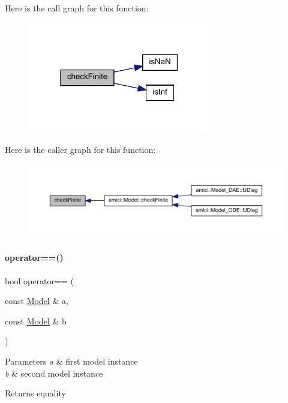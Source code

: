 Here is the call graph for this function\+:
\nopagebreak
\begin{figure}[H]
\begin{center}
\leavevmode
\includegraphics[width=226pt]{namespaceamici_aeb0886d5a74ea04eeef52219063aa7d4_cgraph}
\end{center}
\end{figure}
Here is the caller graph for this function\+:
\nopagebreak
\begin{figure}[H]
\begin{center}
\leavevmode
\includegraphics[width=350pt]{namespaceamici_aeb0886d5a74ea04eeef52219063aa7d4_icgraph}
\end{center}
\end{figure}
\mbox{\label{namespaceamici_ad5a9ae5abc63d6c24c64506c0f9aed6d}} 
\paragraph{\texorpdfstring{operator==()}{operator==()}\hspace{0.1cm}{\footnotesize\ttfamily [1/2]}}
{\footnotesize\ttfamily bool operator== (\begin{DoxyParamCaption}\item[{const \mbox{\hyperlink{classamici_1_1_model}{Model}} \&}]{a,  }\item[{const \mbox{\hyperlink{classamici_1_1_model}{Model}} \&}]{b }\end{DoxyParamCaption})}


\begin{DoxyParams}{Parameters}
{\em a} & first model instance \\
\hline
{\em b} & second model instance \\
\hline
\end{DoxyParams}
\begin{DoxyReturn}{Returns}
equality 
\end{DoxyReturn}


